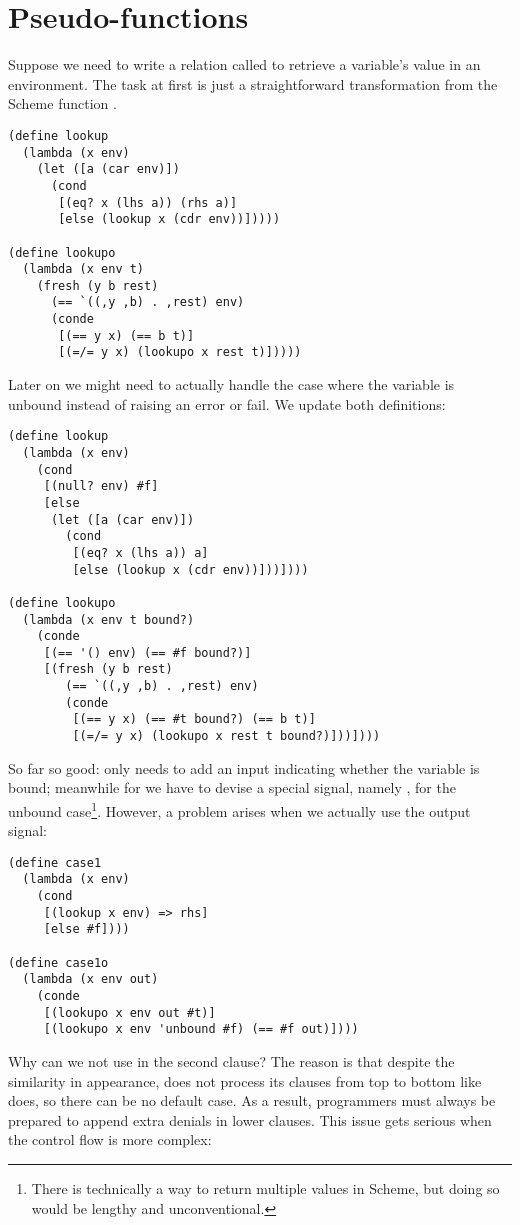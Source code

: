 \section{Pseudo-functions}\label{reif}
Suppose we need to write a relation called  to retrieve a variable's value in an environment. The task at first is just a straightforward transformation from the Scheme function .
\begin{lstlisting}
(define lookup
  (lambda (x env)
    (let ([a (car env)])
      (cond
       [(eq? x (lhs a)) (rhs a)]
       [else (lookup x (cdr env))]))))

(define lookupo
  (lambda (x env t)
    (fresh (y b rest)
      (== `((,y ,b) . ,rest) env)
      (conde
       [(== y x) (== b t)]
       [(=/= y x) (lookupo x rest t)]))))
\end{lstlisting}

Later on we might need to actually handle the case where the variable is unbound instead of raising an error or fail. We update both definitions:
\begin{lstlisting}
(define lookup
  (lambda (x env)
    (cond
     [(null? env) #f]
     [else
      (let ([a (car env)])
        (cond
         [(eq? x (lhs a)) a]
         [else (lookup x (cdr env))]))])))

(define lookupo
  (lambda (x env t bound?)
    (conde
     [(== '() env) (== #f bound?)]
     [(fresh (y b rest)
        (== `((,y ,b) . ,rest) env)
        (conde
         [(== y x) (== #t bound?) (== b t)]
         [(=/= y x) (lookupo x rest t bound?)]))])))
\end{lstlisting}

So far so good:  only needs to add an input indicating whether the variable is bound; meanwhile for  we have to devise a special signal, namely , for the unbound case\footnote{There is technically a way to return multiple values in Scheme, but doing so would be lengthy and unconventional.}. However, a problem arises when we actually use the output signal:
\begin{lstlisting}
(define case1
  (lambda (x env)
    (cond
     [(lookup x env) => rhs]
     [else #f])))

(define case1o
  (lambda (x env out)
    (conde
     [(lookupo x env out #t)]
     [(lookupo x env 'unbound #f) (== #f out)])))
\end{lstlisting}

Why can we not use  in the second clause? The reason is that despite the similarity in appearance,  does not process its clauses from top to bottom like  does, so there can be no default case. As a result, programmers must always be prepared to append extra denials in lower  clauses. This issue gets serious when the control flow is more complex:

